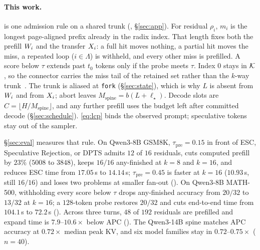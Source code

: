 \paragraph{This work.}
\sys is one admission rule on a shared trunk (, \S\ref{sec:app}).
For residual $\rho_i$, $m_i$ is the longest page-aligned prefix already in the radix index.
That length fixes both the prefill $W_i$ and the transfer $X_i$: a full hit moves nothing, a partial hit moves the miss, a repeated loop ($i{\in}\Lambda$) is withheld, and every other miss is prefilled.
A score below $\tau$ extends past $t_0$ tokens only if the probe meets $\tau$.
Index $0$ stays in $\mathcal{K}$, so the connector carries the miss tail of the retained set rather than the $k$-way trunk~\cite{distserve,splitwise}.
The trunk is aliased at \texttt{fork} (\S\ref{sec:state}), which is why $L$ is absent from $W_i$ and from $X_i$; abort leaves $M_{\mathrm{spine}}=b(L+\ell_\star)$.
Decode slots are $C=\lfloor H/M_{\mathrm{spine}}\rfloor$, and any further prefill uses the budget left after committed decode (\S\ref{sec:schedule}).
\eqref{eq:lcp} binds the observed prompt; speculative tokens stay out of the sampler.

\S\ref{sec:eval} measures that rule.
On Qwen3-8B GSM8K, $\tau_{\mathrm{pre}}{=}0.15$ in front of ESC, Speculative Rejection, or DPTS admits $12$ of $16$ residuals, cuts computed prefill by $23\%$ ($5008$ to $3848$), keeps $16/16$ any-finished at $k{=}8$ and $k{=}16$, and reduces ESC time from $17.05$\,s to $14.14$\,s; $\tau_{\mathrm{pre}}{=}0.45$ is faster at $k{=}16$ ($10.93$\,s, still $16/16$) and loses two problems at smaller fan-out ().
On Qwen3-8B MATH-500, withholding every score below $\tau$ drops any-finished accuracy from $20/32$ to $13/32$ at $k{=}16$; a $128$-token probe restores $20/32$ and cuts end-to-end time from $104.1$\,s to $72.2$\,s ().
Across three turns, $48$ of $192$ residuals are prefilled and expand time is $7.9$--$10.6\times$ below APC ().
The Qwen3-14B spine matches APC accuracy at $0.72\times$ median peak KV, and six model families stay in $0.72$--$0.75\times$ ($n{=}40$).
